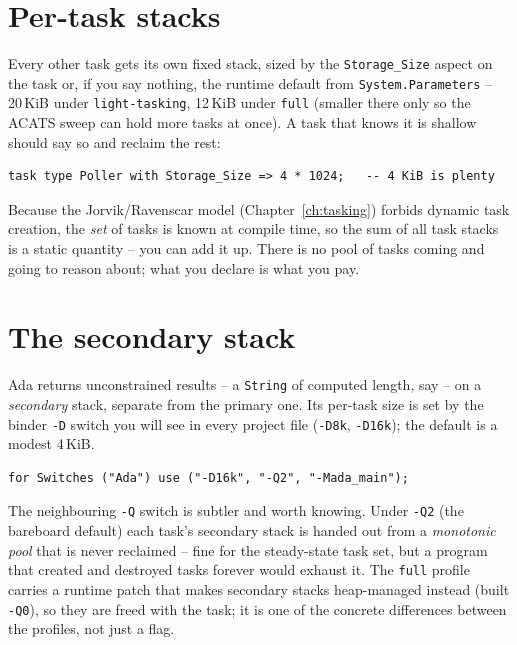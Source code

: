 \section{Per-task stacks}

Every other task gets its own fixed stack, sized by the \texttt{Storage\_Size}
aspect on the task or, if you say nothing, the runtime default from
\texttt{System.Parameters} -- 20\,KiB under \texttt{light-tasking}, 12\,KiB under
\texttt{full} (smaller there only so the ACATS sweep can hold more tasks at once).
A task that knows it is shallow should say so and reclaim the rest:

\begin{lstlisting}
task type Poller with Storage_Size => 4 * 1024;   -- 4 KiB is plenty
\end{lstlisting}

Because the Jorvik/Ravenscar model (Chapter~\ref{ch:tasking}) forbids dynamic task
creation, the \emph{set} of tasks is known at compile time, so the sum of all task
stacks is a static quantity -- you can add it up. There is no pool of tasks coming
and going to reason about; what you declare is what you pay.

\section{The secondary stack}

Ada returns unconstrained results -- a \texttt{String} of computed length, say --
on a \emph{secondary} stack, separate from the primary one. Its per-task size is set
by the binder \texttt{-D} switch you will see in every project file
(\texttt{-D8k}, \texttt{-D16k}); the default is a modest 4\,KiB.

\begin{lstlisting}[style=sh]
for Switches ("Ada") use ("-D16k", "-Q2", "-Mada_main");
\end{lstlisting}

The neighbouring \texttt{-Q} switch is subtler and worth knowing. Under
\texttt{-Q2} (the bareboard default) each task's secondary stack is handed out from
a \emph{monotonic pool} that is never reclaimed -- fine for the steady-state task
set, but a program that created and destroyed tasks forever would exhaust it. The
\texttt{full} profile carries a runtime patch that makes secondary stacks
heap-managed instead (built \texttt{-Q0}), so they are freed with the task; it is
one of the concrete differences between the profiles, not just a flag.

